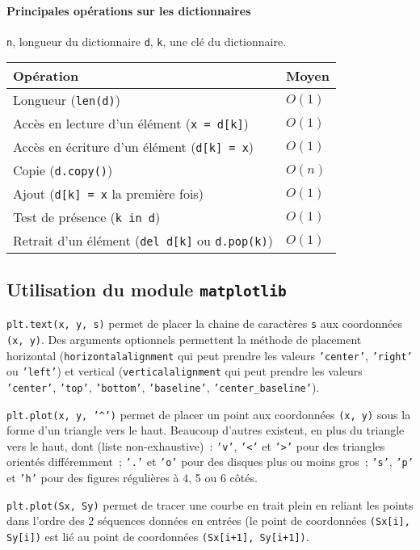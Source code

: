 \paragraph*{Principales opérations sur les dictionnaires}

\texttt{n}, longueur du dictionnaire \texttt{d}, \texttt{k}, une clé du dictionnaire.

\begin{longtable}{|m{9cm}|m{2.1cm}|} \hline
	\bf \centering Opération & \bf \centering Moyen \tabularnewline
	\hline
	\endhead
	Longueur (\texttt{len(d)}) &  $O(1)$ \tabularnewline
	\hline
	Accès en lecture d'un élément (\texttt{x = d[k]})  &  $O(1)$ \tabularnewline
	\hline
	Accès en écriture d'un élément (\texttt{d[k] = x}) &  $O(1)$ \tabularnewline
	\hline
	Copie (\texttt{d.copy()}) & $O(n)$ \tabularnewline
	\hline
	Ajout (\texttt{d[k] = x} la première fois) & $O(1)$ \tabularnewline
	\hline
	Test de présence (\texttt{k in d}) & $O(1)$ \tabularnewline
	\hline
	Retrait d'un élément (\texttt{del d[k]} ou \texttt{d.pop(k)}) & $O(1)$ \tabularnewline
	\hline
\end{longtable}

\subsection*{Utilisation du module \texttt{matplotlib}}

\texttt{plt.text(x, y, s)} permet de placer la chaine de caractères \texttt{s} aux coordonnées \texttt{(x, y)}. Des arguments optionnels permettent la méthode de placement horizontal (\texttt{horizontalalignment} qui peut prendre les valeurs \texttt{'center'}, \texttt{'right'} ou \texttt{'left'}) et vertical (\texttt{verticalalignment} qui peut prendre les valeurs \texttt{'center'}, \texttt{'top'}, \texttt{'bottom'}, \texttt{'baseline'}, \texttt{'center\_baseline'}).

\texttt{plt.plot(x, y, '\textasciicircum')} permet de placer un point aux coordonnées \texttt{(x, y)} sous la forme d'un triangle vers le haut. Beaucoup d'autres existent, en plus du triangle vers le haut, dont (liste non-exhaustive)~: \texttt{'v'}, \texttt{'<'} et \texttt{'>'} pour des triangles orientés différemment~; \texttt{'.'} et \texttt{'o'} pour des disques plus ou moins gros~; \texttt{'s'}, \texttt{'p'} et \texttt{'h'} pour des figures régulières à 4, 5 ou 6 côtés. 

\texttt{plt.plot(Sx, Sy)} permet de tracer une courbe en trait plein en reliant les points dans l'ordre des 2 séquences données en entrées (le point de coordonnées \texttt{(Sx[i], Sy[i])} est lié au point de coordonnées \texttt{(Sx[i+1], Sy[i+1])}.

